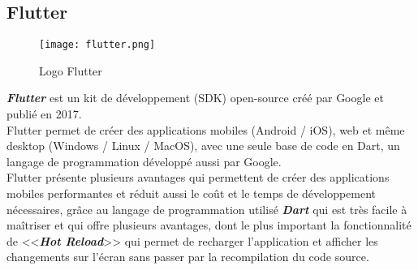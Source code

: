 \subsection{Flutter}
\vspace{1cm}
\begin{figure}[H]
    \centering
    \texttt{[image: flutter.png]}
    \vspace{1cm}
    \captionsetup{justification=centering}

    \caption{Logo Flutter}
    \label{fig:flutter_logo}
\end{figure}
\textit{\textbf{Flutter}} \cite{flutter} est un kit de développement (SDK) open-source créé par Google et publié en 2017.\\
\noindent Flutter permet de créer des applications mobiles (Android / iOS), web et même desktop (Windows / Linux / MacOS), avec une seule base de code en Dart, un langage de programmation développé aussi par Google. \\
\noindent Flutter présente plusieurs avantages qui permettent de créer des applications mobiles performantes et réduit aussi le coût et le temps de développement nécessaires, grâce au langage de programmation utilisé \textit{\textbf{Dart}} qui est très facile à maîtriser et qui offre plusieurs avantages, dont le plus important la fonctionnalité de <<\textit{\textbf{Hot Reload}}>> qui permet de recharger l'application et afficher les changements sur l'écran sans passer par la recompilation du code source.

